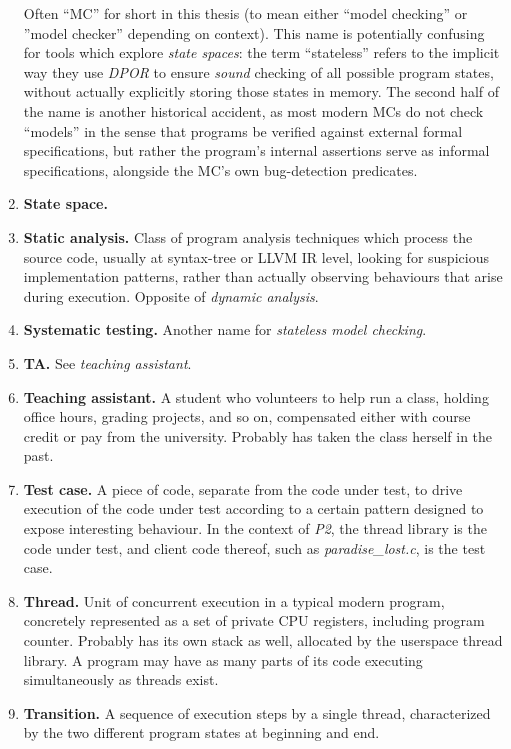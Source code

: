 \begin{enumerate}
		Often ``MC'' for short in this thesis (to mean either ``model checking'' or ''model checker'' depending on context).
		This name is potentially confusing for tools which explore {\em state spaces}:
		the term ``stateless'' refers to the implicit way they use {\em DPOR} to ensure {\em sound} checking
		of all possible program states, without actually explicitly storing those states in memory.
		The second half of the name is another historical accident,
		as most modern MCs do not check ``models'' in the sense that
		programs be verified against external formal specifications,
		but rather the program's internal assertions serve as informal specifications,
		alongside the MC's own bug-detection predicates.
	\item {\bf State space.}
	\item {\bf Static analysis.}
		Class of program analysis techniques which process the source code,
		usually at syntax-tree or LLVM IR level,
		looking for suspicious implementation patterns,
		rather than actually observing behaviours that arise during execution.
		Opposite of {\em dynamic analysis}.
	\item {\bf Systematic testing.}
		Another name for {\em stateless model checking}.
	\item {\bf TA.} See {\em teaching assistant}.
	\item {\bf Teaching assistant.}
		A student who volunteers to help run a class, holding office hours, grading projects, and so on,
		compensated either with course credit or pay from the university.
		Probably has taken the class herself in the past.
	\item {\bf Test case.}
		A piece of code, separate from the code under test,
		to drive execution of the code under test according to a certain pattern designed to expose interesting behaviour.
		In the context of {\em P2}, the thread library is the code under test,
		and client code thereof, such as {\em paradise\_lost.c}, is the test case.
	\item {\bf Thread.}
		Unit of concurrent execution in a typical modern program,
		concretely represented as a set of private CPU registers, including program counter.
		Probably has its own stack as well, allocated by the userspace thread library.
		A program may have as many parts of its code executing simultaneously as threads exist.
	\item {\bf Transition.}
		A sequence of execution steps by a single thread,
		characterized by the two different program states at beginning and end.

\end{enumerate}
